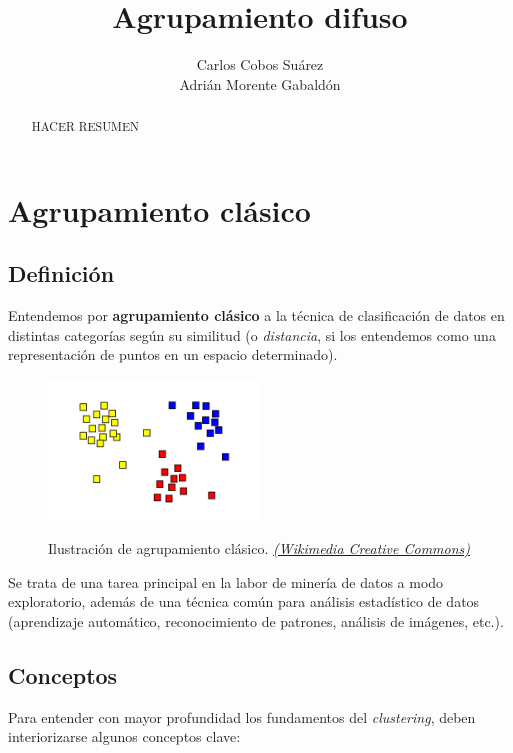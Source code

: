\documentclass[]{report}
\title{Agrupamiento difuso}
\author{Carlos Cobos Suárez\\Adrián Morente Gabaldón}
\begin{document}
\maketitle

\begin{abstract}
	HACER RESUMEN
\end{abstract}

	\chapter{Agrupamiento clásico}
	
		\section{Definición}
		
			Entendemos por \textbf{agrupamiento clásico} a la técnica de clasificación de datos en distintas categorías según su similitud (o \textit{distancia}, si los entendemos como una representación de puntos en un espacio determinado).
			
			\begin{figure}[h]
				\centering
				\includegraphics[width=0.5\textwidth]{clustering.png}
				\label{clustering1}
				\caption{Ilustración de agrupamiento clásico. \href{https://en.wikipedia.org/wiki/Cluster_analysis\#/media/File:Cluster-2.svg}{ \textit{(Wikimedia Creative Commons)}}}
			\end{figure}
		
			Se trata de una tarea principal en la labor de minería de datos a modo exploratorio, además de una técnica común para análisis estadístico de datos (aprendizaje automático, reconocimiento de patrones, análisis de imágenes, etc.).
					
		\section{Conceptos}
		
			Para entender con mayor profundidad los fundamentos del \textit{clustering}, deben interiorizarse algunos conceptos clave:
			
\end{document}
